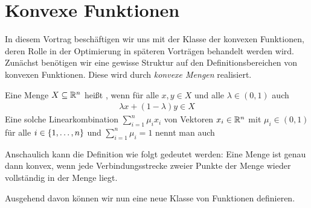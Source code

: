 \documentclass[ %
ngerman, %
a4paper, 
11pt,%
sectionreset, %
chapterstyle=framed, %
sectionstyle=pure, %
titlefont=osfamily %
]{../texmf/tex/latex/mathscriptMathTUD/mathscriptMathTUD}
\institute{Numerik}
\begin{document}
    
\setcounter{chapter}{1}

\chapter{Konvexe Funktionen}

In diesem Vortrag beschäftigen wir uns mit der Klasse der konvexen Funktionen, deren Rolle in der Optimierung in späteren Vorträgen behandelt werden wird. \\
%
Zunächst benötigen wir eine gewisse Struktur auf den Definitionsbereichen von konvexen Funktionen. Diese wird durch \textit{konvexe Mengen} realisiert.

\begin{definition}
	Eine Menge $X \subseteq \mathbb{R}^n$ heißt , wenn für alle $x,y \in X$ und alle $\lambda \in (0,1)$ auch
	\begin{align} \label{eq: def_konvexkombination}
		\lambda x + (1 - \lambda) y \in X
	\end{align}
	Eine solche Linearkombination $\sum_{i=1}^{n} \mu_i x_i$ von Vektoren $x_i \in \mathbb{R}^n$ mit $\mu_i \in (0,1)$ für alle $i \in \left\{ 1,\dots,n \right\}$ und $\sum_{i=1}^n \mu_i = 1$ nennt man auch 
\end{definition}

Anschaulich kann die Definition wie folgt gedeutet werden:
Eine Menge ist genau dann konvex, wenn jede Verbindungsstrecke zweier Punkte der Menge wieder vollständig in der Menge liegt.


Ausgehend davon können wir nun eine neue Klasse von Funktionen definieren.
\end{document}
